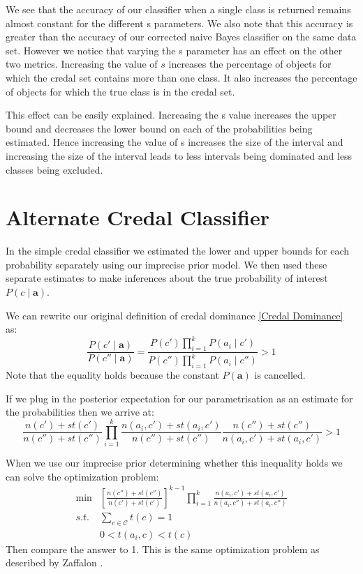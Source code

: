We see that the accuracy of our classifier when a single class is returned remains almost constant for the different s parameters.
We also note that this accuracy is greater than the accuracy of our corrected naive Bayes classifier on the same data set.
However we notice that varying the s parameter has an effect on the other two metrics.
Increasing the value of $s$ increases the percentage of objects for which the credal set contains more than one class.
It also increases the percentage of objects for which the true class is in the credal set.

This effect can be easily explained.
Increasing the s value increases the upper bound and decreases the lower bound on each of the probabilities being estimated.
Hence increasing the value of s increases the size of the interval and increasing the size of the interval leads to less intervals being dominated and less classes being excluded.

\section{Alternate Credal Classifier}
In the simple credal classifier we estimated the lower and upper bounds for each probability separately using our imprecise prior model.
We then used these separate estimates to make inferences about the true probability of interest $P(c \mid \mathbf{a})$.

We can rewrite our original definition of credal dominance \cref{Credal Dominance} as:
\begin{equation}
	\frac{P(c' \mid \mathbf{a})}{P(c'' \mid \mathbf{a})} = \frac{P(c')\prod_{i=1}^{k}P(a_i \mid c')}{P(c'')\prod_{i=1}^{k}P(a_i \mid c'')} > 1
\end{equation}
Note that the equality holds because the constant $P(\mathbf{a})$ is cancelled.

If we plug in the posterior expectation for our parametrisation as an estimate for the probabilities then we arrive at:
\begin{equation}
	\frac{n(c')+st(c')}{n(c'')+st(c'')} \prod_{i=1}^k \frac{n(a_i, c') + st(a_i , c')}{n(c'') + st(c'')} \frac{n(c'') + st(c'')}{n(a_i, c') + st(a_i , c')} > 1
\end{equation}

When we use our imprecise prior determining whether this inequality holds we can solve the optimization problem:
\begin{align}
	\min & \left[ \frac{n(c'')+st(c'')}{n(c')+st(c')} \right]^{k-1} \prod_{i=1}^k \frac{n(a_i, c') + st(a_i , c')}{n(a_i, c'') + st(a_i , c'')} \\
	s.t. & \sum_{c \in \mathcal{C}} t(c) = 1 \\
	& 0 < t(a_i, c) < t(c)
\end{align}
Then compare the answer to 1.
This is the same optimization problem as described by Zaffalon \cite{Zaffalon01}.


